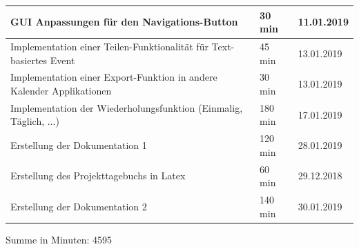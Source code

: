 \begin{longtable}{|p{10cm}|p{2cm}|p{2cm}|}
GUI Anpassungen für den Navigations-Button & 30 min & 11.01.2019 \\ \hline
Implementation einer Teilen-Funktionalität für Text-basiertes Event & 45 min & 13.01.2019 \\ \hline
Implementation einer Export-Funktion in andere Kalender Applikationen & 30 min & 13.01.2019 \\ \hline
Implementation der Wiederholungsfunktion (Einmalig, Täglich, ...) & 180 min & 17.01.2019 \\ \hline
Erstellung der Dokumentation 1 & 120 min & 28.01.2019 \\ \hline
Erstellung des Projekttagebuchs in Latex & 60 min & 29.12.2018 \\ \hline
Erstellung der Dokumentation 2 & 140 min & 30.01.2019 \\ \hline
\end{longtable}
Summe in Minuten: 4595

\newpage

